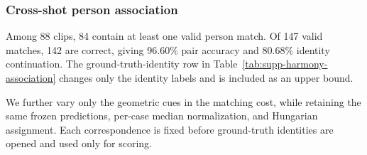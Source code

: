 \begin{table}[t]
  \centering
  \caption{Sensitivity to the shared-translation weight on the Harmony4D
  development split. W/WA are in mm; ATE and cross-shot root error are in m.}
  \label{tab:harmony-lambda-sensitivity}
  \small
  \resizebox{0.94\textwidth}{!}{}
\end{table}

\subsubsection{Cross-shot person association}
\label{app:harmony-association}

Among 88 clips, 84 contain at least one valid person match. Of 147 valid
matches, 142 are correct, giving 96.60\% pair accuracy and 80.68\% identity
continuation. The ground-truth-identity row in
Table~\ref{tab:supp-harmony-association} changes only the identity labels and
is included as an upper bound.

\begin{table}[t]
  \centering
  \caption{Cross-shot person association on Harmony4D. Pair accuracy uses
  147 evaluator-valid endpoint pairs, whereas identity continuation uses all
  176 ground-truth continuations. The ground-truth-identity row changes only
  identity labels and serves as an evaluation upper bound.}
  \label{tab:supp-harmony-association}
  \small
  
\end{table}

We further vary only the geometric cues in the matching cost, while retaining
the same frozen predictions, per-case median normalization, and Hungarian
assignment. Each correspondence is fixed before ground-truth identities are
opened and used only for scoring.

\begin{table}[t]
  \centering
  \caption{Association-cue ablation on 88 Harmony4D cases. Pair accuracy uses
  evaluator-valid endpoint matches for each configuration, identity
  continuation uses all 176 cross-shot ground-truth continuations, and IDF1
  is averaged over the 88 cases.}
  \label{tab:supp-harmony-association-cues}
  \small
  \resizebox{0.94\textwidth}{!}{}
\end{table}

